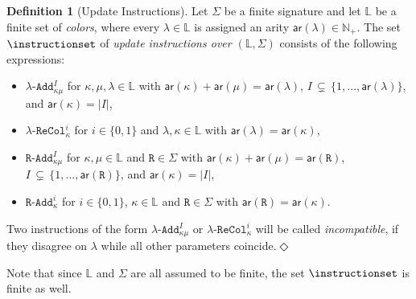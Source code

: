 \documentclass[10pt,a4paper]{amsart}
\theoremstyle{definition}
\numberwithin{equation}{section}
\theoremstyle{plain}
\theoremstyle{definition}
\newtheorem{definition}[definition]{Definition}
\theoremstyle{myexample}
\theoremstyle{plain}
\theoremstyle{definition}
\newcommand{\origcol}{o}
\newcommand{\cols}{\mathbb{L}}
\newcommand{\arity}[1]{\fcn{ar}(#1)}
\newcommand{\cadd}[4]{#4\pred{\texttt{-}Add}^{#3}_{#1#2}} %
\newcommand{\radd}[4]{#4\pred{\texttt{-}Add}^{#3}_{#1#2}}
\newcommand{\unradd}[2]{#2\pred{\texttt{-}Add}_{#1}}
\newcommand{\recol}[2]{#2\pred{\texttt{-}ReCol}_{#1}}
\newcommand{\fcn}[1]{\mathsf{#1}}
\newcommand{\pred}[1]{\mathtt{#1}}
\newcommand{\const}[1]{\mathtt{#1}}
\newcommand{\rpred}{\pred{R}}
\newcommand{\defend}{\hfill\ensuremath{\Diamond}}
\begin{document}
\begin{definition}[Update Instructions]\label{def:instructions}
	Let $\Sigma$ be a finite signature and let $\cols$ be a finite set of \emph{colors}, where every $\lambda\in\cols$ is assigned an arity $\arity{\lambda}\in\mathbb{N}_{+}$.
	The set $\instructionset$ of \emph{update instructions over $(\cols, \Sigma)$} consists of the following expressions:
	\begin{itemize}
		\item \!$\cadd{\kappa}{\mu}{I}{\lambda}$ for $\kappa, \mu, \lambda\in \cols$ with  $\arity{\kappa}+\arity{\mu} = \arity{\lambda}$, $I{\,\subsetneq\,} \{ 1, ..., \arity{\lambda} \}$, and $\arity{\kappa} = |I|$,
		\item \!$\recol{\kappa}{\lambda}^i$ for $i\in \{0,1\}$ and $\lambda, \kappa\in\cols$ with $\arity{\lambda}=\arity{\kappa}$,		
		\item \!$\radd{\kappa}{\mu}{I}{\rpred}$ for $\kappa, \mu\in \cols$ and $\rpred\in \Sigma$ with $\arity{\kappa}+\arity{\mu} = \arity{\rpred}$, $I {\,\subsetneq\,} \{ 1, ..., \arity{\rpred} \}$, and $\arity{\kappa} = |I|$, 
		\item \!$\unradd{\kappa}{\rpred}^i$ for $i\in \{0,1\}$, $\kappa\in\cols$ and $\rpred\in \Sigma$ with $\arity{\rpred} = \arity{\kappa}$.

	\end{itemize}
	Two instructions of the form $\cadd{\kappa}{\mu}{I}{\lambda}$ or $\recol{\kappa}{\lambda}^i$ will be called \emph{incompatible}, if they disagree on $\lambda$ while all other parameters coincide.\defend
\end{definition}
Note that since $\cols$ and $\Sigma$ are all assumed to be finite, the set $\instructionset$ is finite as well.
\pagebreak
\end{document}
